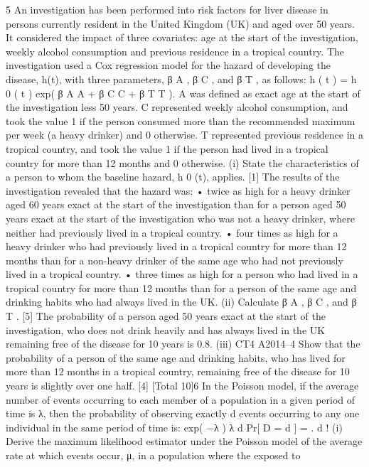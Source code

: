 \documentclass[a4paper,12pt]{article}
\begin{document}
\begin{enumerate}
5
An investigation has been performed into risk factors for liver disease in persons
currently resident in the United Kingdom (UK) and aged over 50 years. It considered
the impact of three covariates: age at the start of the investigation, weekly alcohol
consumption and previous residence in a tropical country.
The investigation used a Cox regression model for the hazard of developing the
disease, h(t), with three parameters, β A , β C , and β T , as follows:
h ( t ) = h 0 ( t ) exp( β A A + β C C + β T T ).
A was defined as exact age at the start of the investigation less 50 years.
C represented weekly alcohol consumption, and took the value 1 if the person
consumed more than the recommended maximum per week (a heavy drinker) and 0
otherwise.
T represented previous residence in a tropical country, and took the value 1 if the
person had lived in a tropical country for more than 12 months and 0 otherwise.
(i)
State the characteristics of a person to whom the baseline hazard, h 0 (t),
applies.
[1]
The results of the investigation revealed that the hazard was:
• twice as high for a heavy drinker aged 60 years exact at the start of the
investigation than for a person aged 50 years exact at the start of the investigation
who was not a heavy drinker, where neither had previously lived in a tropical
country.
• four times as high for a heavy drinker who had previously lived in a tropical
country for more than 12 months than for a non-heavy drinker of the same age
who had not previously lived in a tropical country.
• three times as high for a person who had lived in a tropical country for more than
12 months than for a person of the same age and drinking habits who had always
lived in the UK.
(ii)
Calculate β A , β C , and β T .
[5]
The probability of a person aged 50 years exact at the start of the investigation, who
does not drink heavily and has always lived in the UK remaining free of the disease
for 10 years is 0.8.
(iii)
CT4 A2014–4
Show that the probability of a person of the same age and drinking habits, who
has lived for more than 12 months in a tropical country, remaining free of the
disease for 10 years is slightly over one half.
[4]
[Total 10]6
In the Poisson model, if the average number of events occurring to each member of a
population in a given period of time is λ, then the probability of observing exactly d
events occurring to any one individual in the same period of time is:
exp( −λ ) λ d
Pr[ D = d ] =
.
d !
(i)
Derive the maximum likelihood estimator under the Poisson model of the
average rate at which events occur, μ, in a population where the exposed to

\end{enumerate}
\end{document}
